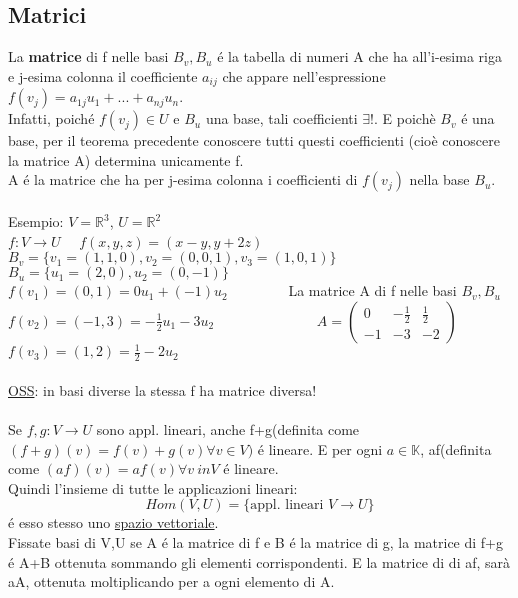 \documentclass[12pt]{article}
\begin{document}
\subsection{Matrici}
La \textbf{matrice} di f nelle basi $B_v, B_u$ é la tabella di numeri A che ha all'i-esima riga e j-esima colonna il coefficiente $a_{ij}$ che appare nell'espressione $f(v_j)=a_{1j}u_1+...+a_{nj}u_n$.\\
Infatti, poiché $f(v_j) \in U$ e $B_u$ una base, tali coefficienti $\exists!$. E poichè $B_v$ é una base, per il teorema precedente conoscere tutti questi coefficienti (cioè conoscere la matrice A) determina unicamente f.\\
A é la matrice che ha per j-esima colonna i coefficienti di $f(v_j)$ nella base $B_u$.\\\\
Esempio: $V=\mathbb{R}^3$, $U=\mathbb{R}^2$\\
$f:V\longrightarrow U\quad$ $f(x,y,z) = (x-y,y+2z)$\\
$B_v=\{v_1=(1,1,0), v_2 = (0,0,1), v_3 = (1,0,1)\}$\\ $B_u=\{u_1=(2,0), u_2=(0,-1)\}$\\
$f(v_1) = (0,1) = 0u_1+(-1)u_2 \quad \quad \quad \quad$ La matrice A di f nelle basi $B_v, B_u$\\
$f(v_2)=(-1,3)=-\frac{1}{2}u_1 -3u_2\quad \quad \quad \quad \quad \quad \quad$    
$ A=\begin{pmatrix}
0 & -\frac{1}{2} & \frac{1}{2}\\
-1 & -3 & -2
\end{pmatrix}$\\ 
$f(v_3)=(1,2)=\frac{1}{2}-2u_2$\\\\
\underline{OSS}: in basi diverse la stessa f ha matrice diversa!\\\\
Se $f,g:V\longrightarrow U$ sono appl. lineari, anche f+g(definita come$(f+g)(v) = f(v)+g(v) \forall v\in V)$ é lineare. E per ogni $a\in \mathbb{K}$, af(definita come $(af)(v)=af(v) \forall v\ in V$ é lineare.\\
Quindi l'insieme di tutte le applicazioni lineari:
$$Hom(V,U)=\{\text{appl. lineari } V\longrightarrow U\}$$
é esso stesso uno \underline{spazio vettoriale}.\\
Fissate basi di V,U se A é la matrice di f e B é la matrice di g, la matrice di f+g é A+B ottenuta sommando gli elementi corrispondenti. E la matrice di di af, sarà aA, ottenuta moltiplicando per a ogni elemento di A.\\
\end{document}
